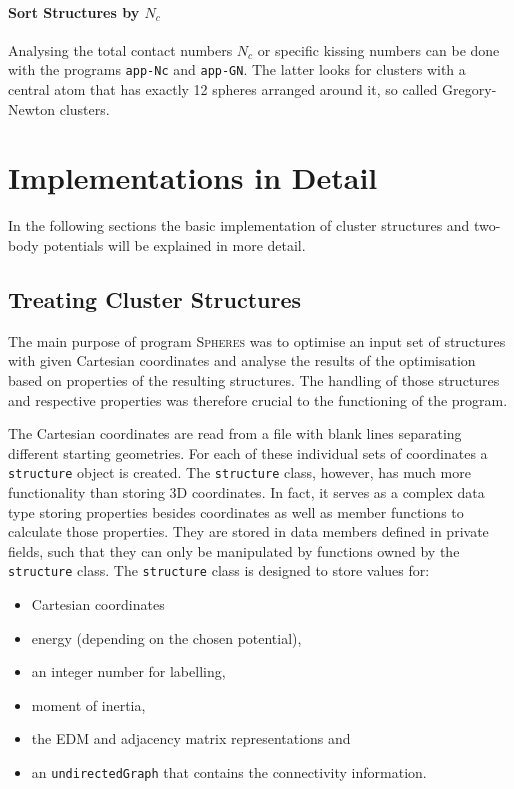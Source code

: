 \paragraph{Sort Structures by $N_c$}%

Analysing the total contact numbers $N_c$ or specific kissing numbers can be
done with the programs \texttt{app-Nc} and \texttt{app-GN}. The latter looks
for clusters with a central atom that has exactly 12 spheres arranged around
it, so called Gregory-Newton clusters.

\section{Implementations in Detail}
\label{sec:ImplementationsinDetail}

In the following sections the basic implementation of cluster structures and
two-body potentials will be explained in more detail.

\subsection{Treating Cluster Structures}
\label{sec:thestructureclass}

The main purpose of program \textsc{Spheres} was to optimise an input set of
structures with given Cartesian coordinates and analyse the results of the
optimisation based on properties of the resulting structures. The handling of
those structures and respective properties was therefore crucial to the
functioning of the program.

The Cartesian coordinates are read from a file with blank lines separating
different starting geometries. For each of these individual sets of coordinates
a \verb|structure| object is created. The \verb|structure| class, however, has
much more functionality than storing 3D coordinates. In fact, it serves as a
complex data type storing properties besides coordinates as well as member
functions to calculate those properties. They are stored in data members defined
in private fields, such that they can only be manipulated by functions owned by
the \verb|structure| class. The \verb|structure| class is designed to store
values for:
\begin{itemize}
    \item Cartesian coordinates
    \item energy (depending on the chosen potential), 
    \item an integer number for labelling, 
    \item moment of inertia, 
    \item the \ac{EDM} and adjacency matrix representations and
    \item an \verb|undirectedGraph| that contains the connectivity information.
\end{itemize}

